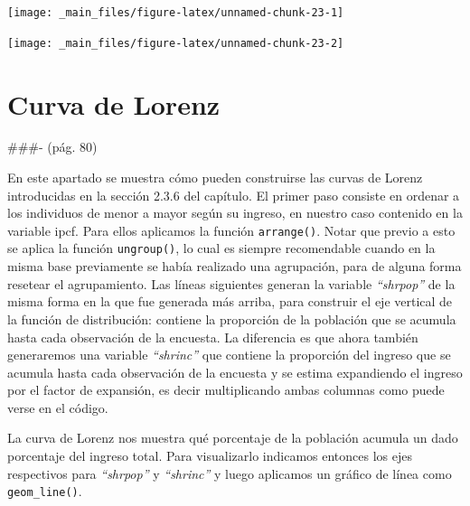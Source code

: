 \documentclass[
]{book}
\newenvironment{Shaded}{\begin{snugshade}}{\end{snugshade}}
\newcommand{\AttributeTok}[1]{\textcolor[rgb]{0.77,0.63,0.00}{#1}}
\newcommand{\ConstantTok}[1]{\textcolor[rgb]{0.00,0.00,0.00}{#1}}
\newcommand{\DocumentationTok}[1]{\textcolor[rgb]{0.56,0.35,0.01}{\textbf{\textit{#1}}}}
\newcommand{\FunctionTok}[1]{\textcolor[rgb]{0.00,0.00,0.00}{#1}}
\newcommand{\NormalTok}[1]{#1}
\newcommand{\SpecialCharTok}[1]{\textcolor[rgb]{0.00,0.00,0.00}{#1}}
\begin{document}
\texttt{[image: \_main\_files/figure-latex/unnamed-chunk-23-1]}

\begin{Shaded}
\end{Shaded}

\texttt{[image: \_main\_files/figure-latex/unnamed-chunk-23-2]}

\hypertarget{curva-de-lorenz}{%
\section{Curva de Lorenz}\label{curva-de-lorenz}}

\#\#\#- (pág. 80)

En este apartado se muestra cómo pueden construirse las curvas de Lorenz introducidas en la sección 2.3.6 del capítulo. El primer paso consiste en ordenar a los individuos de menor a mayor según su ingreso, en nuestro caso contenido en la variable ipcf. Para ellos aplicamos la función \texttt{arrange()}. Notar que previo a esto se aplica la función \texttt{ungroup()}, lo cual es siempre recomendable cuando en la misma base previamente se había realizado una agrupación, para de alguna forma resetear el agrupamiento. Las líneas siguientes generan la variable \emph{``shrpop''} de la misma forma en la que fue generada más arriba, para construir el eje vertical de la función de distribución: contiene la proporción de la población que se acumula hasta cada observación de la encuesta. La diferencia es que ahora también generaremos una variable \emph{``shrinc''} que contiene la proporción del ingreso que se acumula hasta cada observación de la encuesta y se estima expandiendo el ingreso por el factor de expansión, es decir multiplicando ambas columnas como puede verse en el código.

La curva de Lorenz nos muestra qué porcentaje de la población acumula un dado porcentaje del ingreso total. Para visualizarlo indicamos entonces los ejes respectivos para \emph{``shrpop''} y \emph{``shrinc''} y luego aplicamos un gráfico de línea como \texttt{geom\_line()}.
\end{document}
